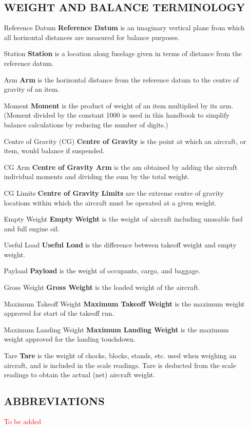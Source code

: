 \subsection{WEIGHT AND BALANCE TERMINOLOGY} 
\begin{Description}
	\item[Reference Datum]\textbf{Reference Datum} is an imaginary vertical plane from which all horizontal distances are measured for balance purposes. 
	\item[Station]\textbf{Station} is a location along fuselage given in terms of distance from the reference datum. 
	\item[Arm]\textbf{Arm} is the horizontal distance from the reference datum to the centre of gravity of an item. 
	\item[Moment]\textbf{Moment} is the product of weight of an item multiplied by its arm. (Moment divided by the constant 1000 is used in this handbook to simplify balance calculations by reducing the number of digits.) 
	\item[Centre of Gravity (CG)]\textbf{Centre of Gravity} is the point at which an aircraft, or item, would balance if suspended. 
	\item[CG Arm]\textbf{Centre of Gravity Arm} is the am obtained by adding the aircraft individual moments and dividing the sum by the total weight. 
	\item[CG Limits]\textbf{Centre of Gravity Limits} are the extreme centre of gravity locations within which the aircraft must be operated at a given weight.
	
	
	\item[Empty Weight]\textbf{Empty Weight} is the weight of aircraft including unusable fuel and full engine oil. 
	\item[Useful Load]\textbf{Useful Load} is the difference between takeoff weight and empty weight. 
	\item[Payload]\textbf{Payload} is the weight of occupants, cargo, and baggage. 
	\item[Gross Weight]\textbf{Gross Weight} is the loaded weight of the aircraft. 
	\item[Maximum Takeoff Weight]\textbf{Maximum Takeoff Weight} is the maximum weight approved for start of the takeoff run. 
	\item[Maximum Landing Weight]\textbf{Maximum Landing Weight} is the maximum weight approved for the landing touchdown. 
	\item[Tare]\textbf{Tare} is the weight of chocks, blocks, stands, etc. used when weighing an aircraft, and is included in the scale readings. Tare is deducted from the scale readings to obtain the actual (net) aircraft weight. 
\end{Description}

\subsection{ABBREVIATIONS} 
\textcolor{red}{To be added}

\cleardoublepage 
